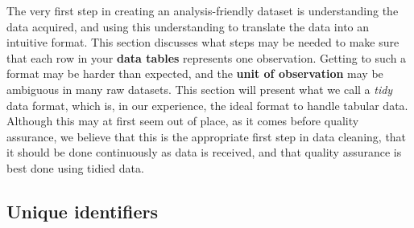 The very first step in creating an analysis-friendly dataset
is understanding the data acquired,
and using this understanding to translate the data into an intuitive format.
This section discusses what steps may be needed to make sure that each row
in your \textbf{data tables}
represents one observation.
Getting to such a format may be harder than expected,
and the \textbf{unit of observation}
 may be ambiguous in many raw datasets.
This section will present what we call a \textit{tidy} data format,
which is, in our experience, the ideal format to handle tabular data.
Although this may at first seem out of place, as it comes before quality assurance,
we believe that this is the appropriate first step in data cleaning,
that it should be done continuously as data is received,
and that quality assurance is best done using tidied data.

\subsection{Unique identifiers}

